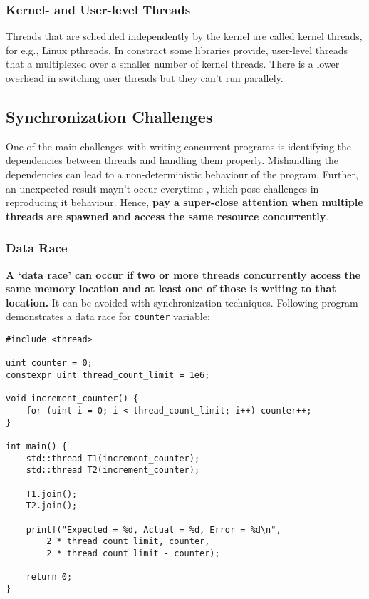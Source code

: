 \documentclass{scrartcl}
\begin{document}
\subsubsection{Kernel- and User-level Threads}
Threads that are scheduled independently by the kernel are called kernel threads, for e.g., Linux pthreads. In constract some libraries provide, user-level threads that a multiplexed over a smaller number of kernel threads. There is a lower overhead in switching user threads but they can't run parallely.

\subsection{Synchronization Challenges}
One of the main challenges with writing concurrent programs is identifying the dependencies between threads and handling them properly. Mishandling the dependencies can lead to a non-deterministic behaviour of the program. Further, an unexpected result mayn't occur everytime , which pose challenges in reproducing it behaviour. Hence, \textbf{pay a super-close attention when multiple threads are spawned and access the same resource concurrently}. 

\subsubsection{Data Race}
\textbf{A `data race' can occur if two or more threads concurrently access the same memory location and at least one of those is writing to that location.} It can be avoided with synchronization techniques. Following program demonstrates a data race for \texttt{counter} variable:

\begin{verbatim}
#include <thread>

uint counter = 0;
constexpr uint thread_count_limit = 1e6;

void increment_counter() {
    for (uint i = 0; i < thread_count_limit; i++) counter++;
}

int main() {
    std::thread T1(increment_counter);
    std::thread T2(increment_counter);

    T1.join();
    T2.join();

    printf("Expected = %d, Actual = %d, Error = %d\n", 
        2 * thread_count_limit, counter, 
        2 * thread_count_limit - counter);

    return 0;
}
\end{verbatim}
\end{document}
